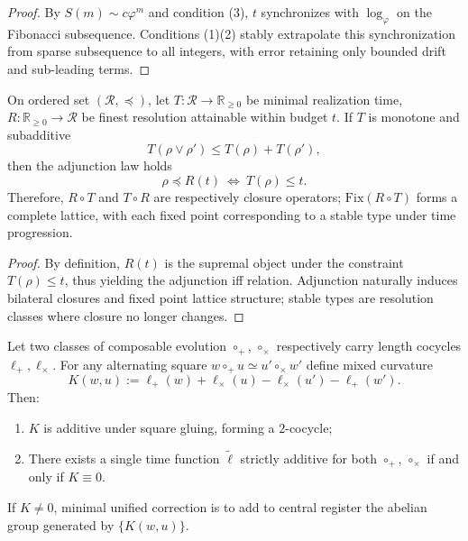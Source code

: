 \begin{proof}
By \(S(m)\sim c\varphi^m\) and condition (3), \(t\) synchronizes with \(\log_\varphi\) on the Fibonacci subsequence.
Conditions (1)(2) stably extrapolate this synchronization from sparse subsequence to all integers, with error retaining only bounded drift and sub-leading terms.
\end{proof}

\begin{theorem}\label{thm:xi-time-resolution-galois-adjunction}
On ordered set \((\mathcal R,\preceq)\), let \(T:\mathcal R\to\mathbb R_{\ge 0}\) be minimal realization time, \(R:\mathbb R_{\ge 0}\to\mathcal R\) be finest resolution attainable within budget \(t\).
If \(T\) is monotone and subadditive
\[
T(\rho\vee\rho')\le T(\rho)+T(\rho'),
\]
then the adjunction law holds
\[
\rho\preceq R(t)\ \Longleftrightarrow\ T(\rho)\le t.
\]
Therefore, \(R\circ T\) and \(T\circ R\) are respectively closure operators;
\(\mathrm{Fix}(R\circ T)\) forms a complete lattice, with each fixed point corresponding to a stable type under time progression.
\end{theorem}

\begin{proof}
By definition, \(R(t)\) is the supremal object under the constraint \(T(\rho)\le t\), thus yielding the adjunction iff relation.
Adjunction naturally induces bilateral closures and fixed point lattice structure; stable types are resolution classes where closure no longer changes.
\end{proof}

\begin{theorem}\label{thm:xi-mixed-curvature-zero-criterion}
Let two classes of composable evolution \(\circ_+\), \(\circ_\times\) respectively carry length cocycles \(\ell_+,\ell_\times\).
For any alternating square
\(
w\circ_+u\simeq u'\circ_\times w'
\)
define mixed curvature
\[
K(w,u):=\ell_+(w)+\ell_\times(u)-\ell_\times(u')-\ell_+(w').
\]
Then:
\begin{enumerate}
  \item \(K\) is additive under square gluing, forming a \(2\)-cocycle;
  \item There exists a single time function \(\widetilde\ell\) strictly additive for both \(\circ_+\), \(\circ_\times\)
  if and only if \(K\equiv 0\).
\end{enumerate}
If \(K\neq 0\), minimal unified correction is to add to central register the abelian group generated by \(\{K(w,u)\}\).
\end{theorem}

